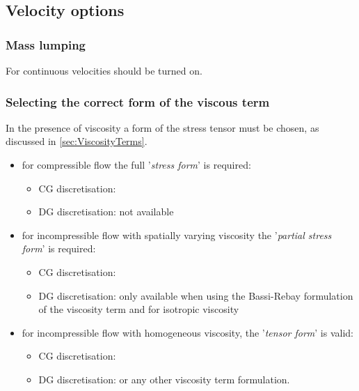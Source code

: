 \subsection{Velocity options}\label{sec:VelocityOptions}
\subsubsection{Mass lumping}
For continuous velocities  should be turned on.
\subsubsection{Selecting the correct form of the viscous term}
In the presence of viscosity a form of the stress tensor must be chosen, as discussed in \ref{sec:ViscosityTerms}. 
\begin{itemize}
\item for compressible flow the full '\emph{stress form}' is required: 
\begin{itemize} 
\item CG discretisation: 
\item DG discretisation: not available
\end{itemize}
\item for incompressible flow with spatially varying viscosity the '\emph{partial stress form}' is required:
\begin{itemize} 
\item CG discretisation: 
\item DG discretisation: only available when using the Bassi-Rebay formulation of the viscosity term and for isotropic viscosity 
\end{itemize}
\item for incompressible flow with homogeneous viscosity, the '\emph{tensor form}' is valid:
\begin{itemize} 
\item CG discretisation: 
\item DG discretisation:  or any other viscosity term formulation.
\end{itemize}
\end{itemize}

